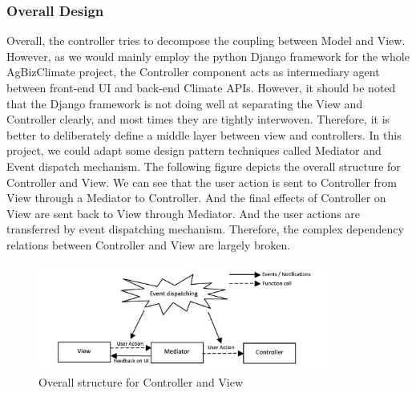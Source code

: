 \documentclass[onecolumn, draftclsnofoot,10pt, compsoc]{article}
\begin{document}
			\subsubsection{Overall Design}
			Overall, the controller tries to decompose the coupling between Model and View. However, as we would mainly employ the python Django framework for the whole AgBizClimate project, the Controller component acts as intermediary agent between front-end UI and back-end Climate APIs. However, it should be noted that the Django framework is not doing well at separating the View and Controller clearly, and most times they are tightly interwoven. Therefore, it is better to deliberately define a middle layer between view and controllers. In this project, we could adapt some design pattern techniques called Mediator and Event dispatch mechanism. The following figure depicts the overall structure for Controller and View. We can see that the user action is sent to Controller from View through a Mediator to Controller. And the final effects of Controller on View are sent back to View through Mediator. And the user actions are transferred by event dispatching mechanism. Therefore, the complex dependency relations between Controller and View are largely broken.\\

	\begin{figure}[htb]
		\begin{center}
			\includegraphics[width=275pt]{UMLDiagrams/Controller.jpeg}
		\end{center}
		\caption{Overall structure for Controller and View}
		\label{fig:Con}
		\end{figure}
\end{document}
